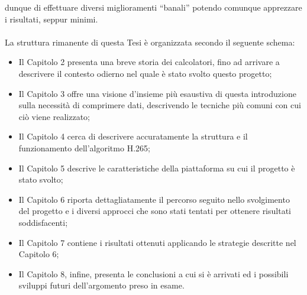 dunque di effettuare diversi miglioramenti ``banali'' potendo comunque
apprezzare i risultati, seppur minimi.
\\ \\
La struttura rimanente di questa Tesi è organizzata secondo il seguente schema:
\begin{itemize}
\item Il Capitolo 2 presenta una breve storia dei calcolatori, fino ad arrivare
      a descrivere il contesto odierno nel quale è stato svolto questo progetto;
\item Il Capitolo 3 offre una visione d'insieme più esaustiva di questa 
      introduzione sulla necessità di comprimere dati, descrivendo le tecniche
      più comuni con cui ciò viene realizzato;
\item Il Capitolo 4 cerca di descrivere accuratamente la struttura e il
      funzionamento dell'algoritmo H.265;
\item Il Capitolo 5 descrive le caratteristiche della piattaforma su cui il
      progetto è stato svolto;
\item Il Capitolo 6 riporta dettagliatamente il percorso seguito nello 
      svolgimento del progetto e i diversi approcci che sono stati tentati per
      ottenere risultati soddisfacenti;
\item Il Capitolo 7 contiene i risultati ottenuti applicando le strategie
      descritte nel Capitolo 6;
\item Il Capitolo 8, infine, presenta le conclusioni a cui si è arrivati ed i
      possibili sviluppi futuri dell'argomento preso in esame.
\end{itemize}